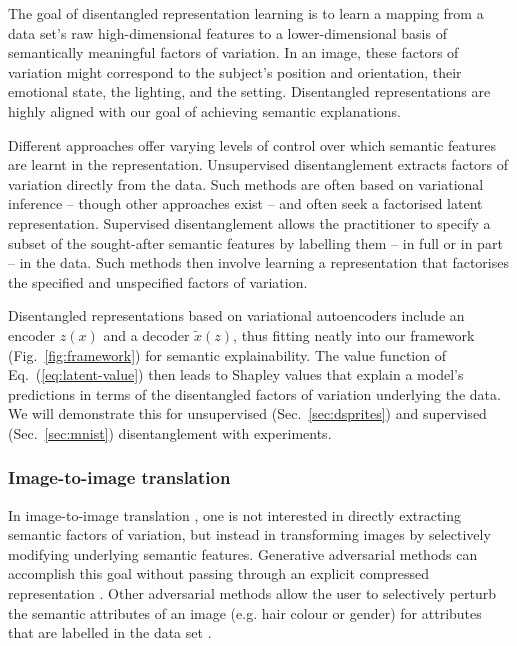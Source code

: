 \documentclass{article}
\DeclareRobustCommand{\Sec}[1]{Sec.~\ref{sec:#1}}
\DeclareRobustCommand{\Fig}[1]{Fig.~\ref{fig:#1}}
\DeclareRobustCommand{\Eq}[1]{Eq.~(\ref{eq:#1})}
\begin{document}
The goal of disentangled representation learning \citep{Bengio,Schmidhuber} is to learn a mapping from a data set's raw high-dimensional features to a lower-dimensional basis of semantically meaningful factors of variation. In an image, these factors of variation might correspond to the subject's position and orientation, their emotional state, the lighting, and the setting. Disentangled representations are highly aligned with our goal of achieving semantic explanations.

Different approaches offer varying levels of control over which semantic features are learnt in the representation. Unsupervised disentanglement extracts factors of variation directly from the data. Such methods are often based on variational inference \citep{BetaVAEH,BetaVAEB,FactorVAE,Btcvae} -- though other approaches exist \citep{InfoGAN} -- and often seek a factorised latent representation. 
Supervised disentanglement \citep{Schmidhuber,FaderNetworks} allows the practitioner to specify a subset of the sought-after semantic features by labelling them -- in full or in part \citep{WeaklySupervisedDisentanglement} -- in the data. Such methods then involve learning a representation that factorises the specified and unspecified factors of variation.

Disentangled representations based on variational autoencoders \citep{VAEKingma} include an encoder $z(x)$ and a decoder $\tilde x(z)$, thus fitting neatly into our framework (\Fig{framework}) for semantic explainability. The value function of \Eq{latent-value} then leads to Shapley values that explain a model's predictions in terms of the disentangled factors of variation underlying the data. We will demonstrate this for unsupervised (\Sec{dsprites}) and supervised (\Sec{mnist}) disentanglement with experiments.


\subsubsection{Image-to-image translation}
\label{sec:translation}


In image-to-image translation \citep{image2image}, one is not interested in directly extracting semantic factors of variation, but instead in transforming images by selectively modifying underlying semantic features. Generative adversarial methods can accomplish this goal without passing through an explicit compressed representation \citep{CycleGAN}. Other adversarial methods allow the user to selectively perturb the semantic attributes of an image (e.g. hair colour or gender) for attributes that are labelled in the data set \citep{stargan,Attgan,Stgan}. 
\end{document}
